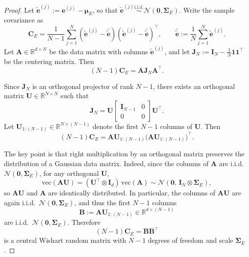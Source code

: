 \documentclass[11pt,a4paper]{article}
\begin{document}
\begin{proof}
Let $\tilde{\mathbf{e}}^{(j)}:=\mathbf{e}^{(j)}-\boldsymbol{\mu}_E$, so that
$\tilde{\mathbf{e}}^{(j)}\stackrel{\mathrm{i.i.d.}}{\sim}\mathcal{N}(\mathbf{0},\boldsymbol{\Sigma}_E)$.
Write the sample covariance as
\begin{equation}
\mathbf{C}_E
=
\frac{1}{N-1}\sum_{j=1}^N(\tilde{\mathbf{e}}^{(j)}-\bar{\tilde{\mathbf{e}}})(\tilde{\mathbf{e}}^{(j)}-\bar{\tilde{\mathbf{e}}})^\top,
\qquad
\bar{\tilde{\mathbf{e}}}:=\frac{1}{N}\sum_{j=1}^N \tilde{\mathbf{e}}^{(j)}.
\end{equation}
Let $\mathbf{A}\in\mathbb{R}^{d\times N}$ be the data matrix with columns $\tilde{\mathbf{e}}^{(j)}$, and let
$\mathbf{J}_N:=\mathbf{I}_N-\frac{1}{N}\mathbf{1}\mathbf{1}^\top$ be the centering matrix. Then
\begin{equation}
(N-1)\mathbf{C}_E=\mathbf{A}\mathbf{J}_N\mathbf{A}^\top.
\end{equation}

\smallskip
\noindent Since $\mathbf{J}_N$ is an orthogonal projector of rank $N-1$, there exists an orthogonal matrix
$\mathbf{U}\in\mathbb{R}^{N\times N}$ such that
\begin{equation}
\mathbf{J}_N
=
\mathbf{U}
\begin{bmatrix}
\mathbf{I}_{N-1} & 0\\
0 & 0
\end{bmatrix}
\mathbf{U}^\top.
\end{equation}
Let $\mathbf{U}_{1:(N-1)}\in\mathbb{R}^{N\times (N-1)}$ denote the first $N-1$ columns of $\mathbf{U}$. Then
\begin{equation}
(N-1)\mathbf{C}_E
=
\mathbf{A}\mathbf{U}_{1:(N-1)}
\bigl(\mathbf{A}\mathbf{U}_{1:(N-1)}\bigr)^\top.
\end{equation}

The key point is that right multiplication by an orthogonal matrix preserves the distribution of a Gaussian data matrix. Indeed, since the columns of $\mathbf{A}$ are i.i.d.\ $\mathcal{N}(\mathbf{0},\boldsymbol{\Sigma}_E)$, for any orthogonal $\mathbf{U}$,
\begin{equation}
\mathrm{vec}(\mathbf{A}\mathbf{U})
=
(\mathbf{U}^\top\otimes \mathbf{I}_d)\,\mathrm{vec}(\mathbf{A})
\sim
\mathcal{N}\!\left(\mathbf{0},\,\mathbf{I}_N\otimes \boldsymbol{\Sigma}_E\right),
\end{equation}
so $\mathbf{A}\mathbf{U}$ and $\mathbf{A}$ are identically distributed. In particular, the columns of $\mathbf{A}\mathbf{U}$ are again i.i.d.\ $\mathcal{N}(\mathbf{0},\boldsymbol{\Sigma}_E)$, and thus the first $N-1$ columns
\begin{equation}
\mathbf{B}:=\mathbf{A}\mathbf{U}_{1:(N-1)}\in\mathbb{R}^{d\times (N-1)}
\end{equation}
are i.i.d.\ $\mathcal{N}(\mathbf{0},\boldsymbol{\Sigma}_E)$. Therefore
\begin{equation}
(N-1)\mathbf{C}_E=\mathbf{B}\mathbf{B}^\top
\end{equation}
is a central Wishart random matrix with $N-1$ degrees of freedom and scale $\boldsymbol{\Sigma}_E$.


\end{proof}
\end{document}
